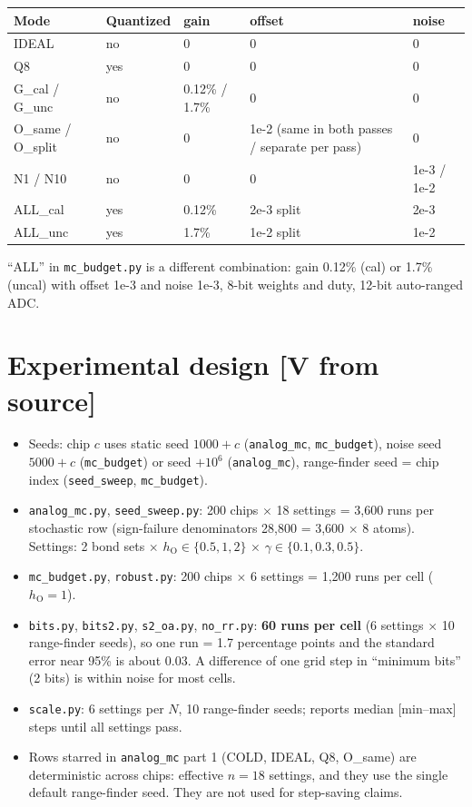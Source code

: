 \documentclass[11pt]{article}
\newcommand{\x}{$\times$}
\newcommand{\scr}[1]{\texttt{#1}}
\begin{document}
\begin{center}
\begin{tabularx}{\textwidth}{@{}lllLl@{}}
\toprule
Mode & Quantized & gain & offset & noise \\
\midrule
IDEAL & no & 0 & 0 & 0 \\
Q8 & yes & 0 & 0 & 0 \\
G\_cal / G\_unc & no & 0.12\% / 1.7\% & 0 & 0 \\
O\_same / O\_split & no & 0 & 1e-2 (same in both passes / separate per pass) & 0 \\
N1 / N10 & no & 0 & 0 & 1e-3 / 1e-2 \\
ALL\_cal & yes & 0.12\% & 2e-3 split & 2e-3 \\
ALL\_unc & yes & 1.7\% & 1e-2 split & 1e-2 \\
\bottomrule
\end{tabularx}
\end{center}

``ALL'' in \scr{mc\_budget.py} is a different combination: gain 0.12\% (cal) or 1.7\% (uncal) with offset 1e-3 and noise 1e-3, 8-bit weights and duty, 12-bit auto-ranged ADC.

\section{Experimental design [V from source]}

\begin{itemize}
  \item Seeds: chip $c$ uses static seed $1000 + c$ (\scr{analog\_mc}, \scr{mc\_budget}), noise seed $5000 + c$ (\scr{mc\_budget}) or seed $+ 10^6$ (\scr{analog\_mc}), range-finder seed = chip index (\scr{seed\_sweep}, \scr{mc\_budget}).
  \item \scr{analog\_mc.py}, \scr{seed\_sweep.py}: 200 chips \x{} 18 settings = 3,600 runs per stochastic row (sign-failure denominators 28,800 = 3,600 \x{} 8 atoms). Settings: 2 bond sets \x{} $h_\mathrm{O} \in \{0.5, 1, 2\}$ \x{} $\gamma \in \{0.1, 0.3, 0.5\}$.
  \item \scr{mc\_budget.py}, \scr{robust.py}: 200 chips \x{} 6 settings = 1,200 runs per cell ($h_\mathrm{O} = 1$).
  \item \scr{bits.py}, \scr{bits2.py}, \scr{s2\_oa.py}, \scr{no\_rr.py}: \textbf{60 runs per cell} (6 settings \x{} 10 range-finder seeds), so one run = 1.7 percentage points and the standard error near 95\% is about 0.03. A difference of one grid step in ``minimum bits'' (2 bits) is within noise for most cells.
  \item \scr{scale.py}: 6 settings per $N$, 10 range-finder seeds; reports median [min--max] steps until all settings pass.
  \item Rows starred in \scr{analog\_mc} part 1 (COLD, IDEAL, Q8, O\_same) are deterministic across chips: effective $n = 18$ settings, and they use the single default range-finder seed. They are not used for step-saving claims.
\end{itemize}
\end{document}
